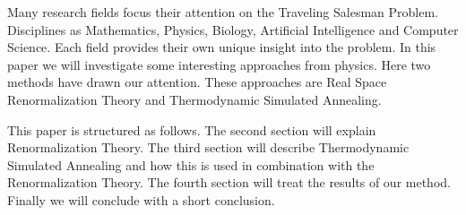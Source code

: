 Many research fields focus their attention on the Traveling Salesman Problem. Disciplines as Mathematics, Physics, Biology, Artificial Intelligence and Computer Science. Each field provides their own unique insight into the problem. In this paper we will investigate some interesting approaches from physics. Here two methods have drawn our attention. These approaches are Real Space Renormalization Theory and Thermodynamic Simulated Annealing. 

This paper is structured as follows. The second section will explain Renormalization Theory. The third section will describe Thermodynamic Simulated Annealing and how this is used in combination with the Renormalization Theory. The fourth section will treat the results of our method. Finally we will conclude with a short conclusion.


